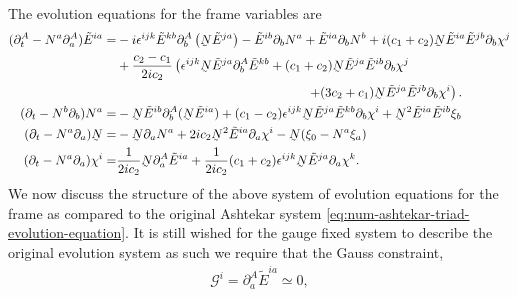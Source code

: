 \documentclass[10pt]{report}
\newcommand{\utilde}[1]{\underaccent{\tilde}{#1}}
\theoremstyle{definition}
\newcommand{\tE}[0]{\tilde{E}}
\newcommand{\dlap}[0]{\utilde{N}}
\begin{document}
    The evolution equations for the frame variables are
    \begin{align}
        (\partial^A_t - N^a \partial^A_a) \tE^{ia} = & -i \epsilon^{ijk} \tE^{kb} \partial_b^A \left(\dlap \tE^{ja}\right) - \tE^{ib} \partial_b N^a + \tE^{ia} \partial_b N^b + i(c_1 + c_2) \dlap \tE^{ia} \tE^{jb} \partial_b \chi^j \nonumber\\ & + \frac{c_2-c_1}{2 i c_2}\left( \epsilon^{ijk} \dlap \tE^{ja} \partial_b^A \tE^{kb} + (c_1+c_2) \dlap \tE^{ja} \tE^{ib} \partial_b \chi^j \right. \nonumber \\ & \left. \hspace{150pt} + (3c_2 + c_1) \dlap \tE^{ja} \tE^{jb} \partial_b \chi^i \right). \label{eq:num-plebanski-triad-evolution-equation} \\
        (\partial_t - N^b \partial_b) N^a = & - \dlap \tE^{ib} \partial_b^A( \dlap \tE^{ia}) + (c_1 - c_2) \epsilon^{ijk} \dlap \tE^{ja} \tE^{kb} \partial_b \chi^i + \dlap^2 \tE^{ia} \tE^{ib} \xi_b \label{eq:num-plebanski-shift-evolution-equation} \\
        (\partial_t - N^a \partial_a)\dlap = & - \dlap \partial_a N^a + 2ic_2 \dlap^2 \tE^{ia} \partial_a \chi^i - \dlap ( \xi_0 - N^a \xi_a) \label{eq:num-plebanski-lapse-evolution-equation} \\
        (\partial_t - N^a \partial_a) \chi^i = & \frac{1}{2 i c_2} \dlap \partial^A_a \tE^{ia} + \frac{1}{2 i c_2} (c_1 + c_2) \epsilon^{ijk} \dlap \tE^{ja} \partial_a \chi^k. \label{eq:num-plebanski-internal-vector-evolution}
    \end{align}
    We now discuss the structure of the above system of evolution equations for the frame as compared to the original Ashtekar system \cref{eq:num-ashtekar-triad-evolution-equation}. It is still wished for the gauge fixed system to describe the original evolution system as such we require that the Gauss constraint,
    \begin{align}
        \mathcal{G}^i = \partial^A_a \tE^{ia} \simeq 0,
    \end{align}
\end{document}
